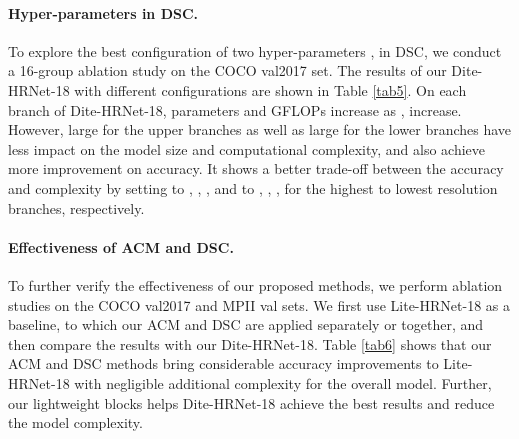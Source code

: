 \documentclass{article}
\begin{document}
\begin{table}[t]
\centering
{}
\caption{Ablation studies on the COCO val2017 and MPII val sets. The MFLOPs is computed with the input size  for the COCO val2017 set and  for the MPII val set, respectively. }
\label{tab6}
\end{table}

\paragraph{Hyper-parameters in DSC.} To explore the best configuration of two hyper-parameters ,  in DSC, we conduct a 16-group ablation study on the COCO val2017 set. The results of our Dite-HRNet-18 with different configurations are shown in Table \ref{tab5}. On each branch of Dite-HRNet-18, parameters and GFLOPs increase as ,  increase. However, large  for the upper branches as well as large  for the lower branches have less impact on the model size and computational complexity, and also achieve more improvement on accuracy. It shows a better trade-off between the accuracy and complexity by setting  to , , ,  and  to , , ,  for the highest to lowest resolution branches, respectively.

\paragraph{Effectiveness of ACM and DSC.} To further verify the effectiveness of our proposed methods, we perform ablation studies on the COCO val2017 and MPII val sets. We first use Lite-HRNet-18 \cite{yu:litehrnet} as a baseline, to which our ACM and DSC are applied separately or together, and then compare the results with our Dite-HRNet-18. Table \ref{tab6} shows that our ACM and DSC methods bring considerable accuracy improvements to Lite-HRNet-18 with negligible additional complexity for the overall model. Further, our lightweight blocks helps Dite-HRNet-18 achieve the best results and reduce the model complexity.
\end{document}
